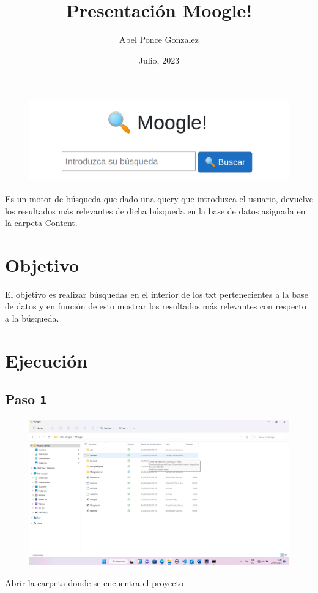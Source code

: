 \documentclass [a4paper,12pt]{article}
\begin{document}
\title{Presentación Moogle!}
\author{Abel Ponce Gonzalez}
\date{Julio, 2023}
\maketitle
\newpage
\begin{figure}[h]
	\center
	\includegraphics[width = 15cm]{moogle.png}
	\label{fig:moogle}
\end{figure}
Es un motor de búsqueda que dado una query que introduzca el usuario, devuelve los resultados más relevantes de dicha búsqueda en la base de datos asignada en la carpeta Content.
\section{Objetivo}\label{sec:objetivos}
El objetivo es realizar búsquedas en el interior de los txt pertenecientes a la base de datos y en función de esto mostrar los resultados más relevantes con respecto a la búsqueda.
\section{Ejecución}\label{sec:ejecucion}
\subsection{Paso \texttt{1}}\label{sub:center}
\begin{figure}[h]
	\center
	\includegraphics[width = 14cm]{Carpeta.png}
	\label{fig:carpeta}
\end{figure}
Abrir la carpeta donde se encuentra el proyecto
\end{document}
